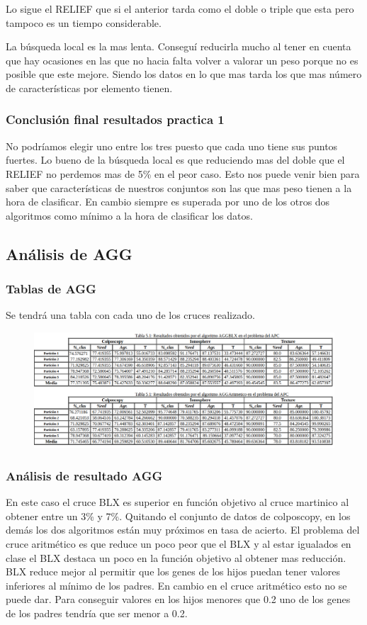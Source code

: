 \documentclass[titlepage]{article}
\begin{document}
	Lo sigue el RELIEF que si el anterior tarda como el doble o triple que esta pero tampoco es un tiempo considerable.
	
	La búsqueda local es la mas lenta. Conseguí reducirla mucho al tener en cuenta que hay ocasiones en las que no hacia falta volver a valorar un peso porque no es posible que este mejore. Siendo los datos en lo que mas tarda los que mas número de características por elemento tienen.
	
	
	\subsubsection{Conclusión final resultados practica 1}
	No podríamos elegir uno entre los tres puesto que cada uno tiene sus puntos fuertes. Lo bueno de la búsqueda local es que reduciendo mas del doble que el RELIEF no perdemos mas de 5\% en el peor caso. Esto nos puede venir bien para saber que características de nuestros conjuntos son las que mas peso tienen a la hora de clasificar. En cambio siempre es superada por uno de los otros dos algoritmos como mínimo a la hora de clasificar los datos.

	\subsection{Análisis de AGG}
	\subsubsection{Tablas de AGG}
	Se tendrá una tabla con cada uno de los cruces realizado.
	\begin{figure}[H]
		\centering
		\includegraphics[width=1\linewidth]{screenshot005}
		\caption{}
		\label{fig:screenshot005}
	\end{figure}
	
	\subsubsection{Análisis de resultado AGG}
	En este caso el cruce BLX  es superior en función objetivo al cruce martinico al obtener entre un 3\% y 7\%. Quitando el conjunto de datos de colposcopy, en los demás los dos algoritmos están muy próximos en tasa de acierto. El problema del cruce aritmético es que reduce un poco peor que el BLX y al estar igualados en clase el BLX destaca un poco en la función objetivo al obtener mas reducción. BLX reduce mejor al permitir que los genes de los hijos puedan tener valores inferiores al mínimo de los padres. En cambio en el cruce aritmético esto no se puede dar. Para conseguir valores en los hijos menores que 0.2 uno de los genes de los padres tendría que ser menor a 0.2.
	
\end{document}
